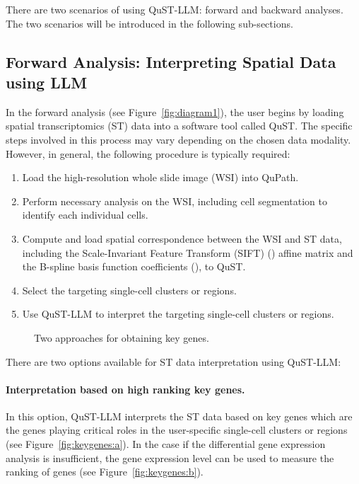 \documentclass{article}
\begin{document}
There are two scenarios of using QuST-LLM: forward and backward analyses. The two scenarios will be introduced in the following sub-sections.

\subsection{Forward Analysis: Interpreting Spatial Data using LLM}

In the forward analysis (see Figure~\ref{fig:diagram1}), the user begins by loading spatial transcriptomics (ST) data into a software tool called QuST. The specific steps involved in this process may vary depending on the chosen data modality. However, in general, the following procedure is typically required:
\begin{enumerate}
	\item Load the high-resolution whole slide image (WSI) into QuPath.
	\item Perform necessary analysis on the WSI, including cell segmentation to identify each individual cells.
	\item Compute and load spatial correspondence between the WSI and ST data, including the Scale-Invariant Feature Transform (SIFT) (\cite{Lowe:2004}) affine matrix and the B-spline basis function coefficients (\cite{Sorzano:2005}), to QuST.
	\item Select the targeting single-cell clusters or regions.
	\item Use QuST-LLM to interpret the targeting single-cell clusters or regions. 
\end{enumerate}

\begin{figure}[t]
	\centering%
	\hfill%
	\caption{Two approaches for obtaining key genes.}%
	\label{fig:keygenes}
\end{figure}

There are two options available for ST data interpretation using QuST-LLM:
\paragraph{Interpretation based on high ranking key genes.} In this option, QuST-LLM interprets the ST data based on key genes which are the genes playing critical roles in the user-specific single-cell clusters or regions (see Figure~\ref{fig:keygenes:a}). In the case if the differential gene expression analysis is insufficient, the gene expression level can be used to measure the ranking of genes (see Figure~\ref{fig:keygenes:b}).
\end{document}
